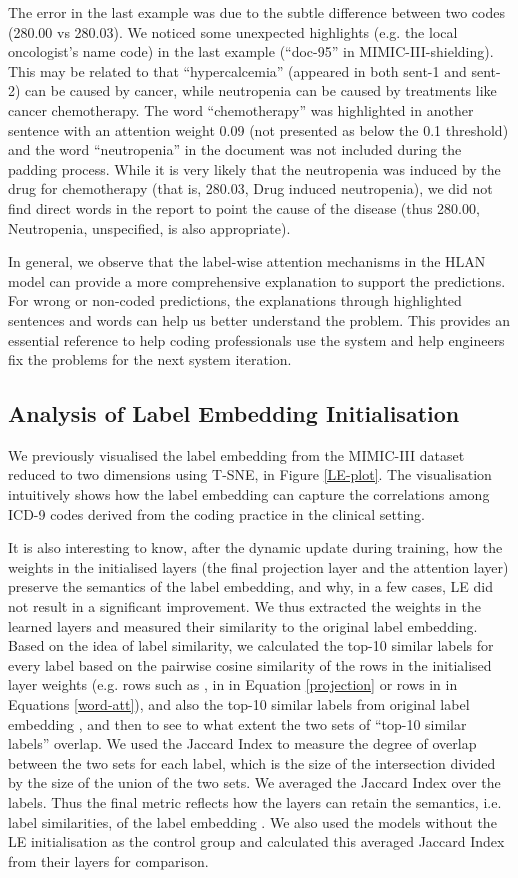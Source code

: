 \documentclass[final,5p,times,twocolumn]{elsarticle}
\begin{document}
The error in the last example was due to the subtle difference between two codes (280.00 vs 280.03). We noticed some unexpected highlights (e.g. the local oncologist's name code) in the last example (``doc-95'' in MIMIC-III-shielding). This may be related to that ``hypercalcemia'' (appeared in both sent-1 and sent-2) can be caused by cancer, while neutropenia can be caused by treatments like cancer chemotherapy. The word ``chemotherapy'' was highlighted in another sentence with an attention weight 0.09 (not presented as below the 0.1 threshold) and the word ``neutropenia'' in the document was not included during the padding process. While it is very likely that the neutropenia was induced by the drug for chemotherapy (that is, 280.03, Drug induced neutropenia), we did not find direct words in the report to point the cause of the disease (thus 280.00, Neutropenia, unspecified, is also appropriate).

In general, we observe that the label-wise attention mechanisms in the HLAN model can provide a more comprehensive explanation to support the predictions. For wrong or non-coded predictions, the explanations through highlighted sentences and words can help us better understand the problem. This provides an essential reference to help coding professionals use the system and help engineers fix the problems for the next system iteration.

\subsection{Analysis of Label Embedding Initialisation}
\label{le_analysis}
We previously visualised the label embedding from the MIMIC-III dataset reduced to two dimensions using T-SNE, in Figure \ref{LE-plot}. The visualisation intuitively shows how the label embedding can capture the correlations among ICD-9 codes derived from the coding practice in the clinical setting.

It is also interesting to know, after the dynamic update during training, how the weights in the initialised layers (the final projection layer and the attention layer) preserve the semantics of the label embedding, and why, in a few cases, LE did not result in a significant improvement. We thus extracted the weights in the learned layers and measured their similarity to the original label embedding. Based on the idea of label similarity, we calculated the top-10 similar labels for every label based on the pairwise cosine similarity of the rows in the initialised layer weights (e.g. rows such as ,  in  in Equation \ref{projection} or rows  in  in Equations \ref{word-att}), and also the top-10 similar labels from original label embedding , and then to see to what extent the two sets of ``top-10 similar labels'' overlap. We used the Jaccard Index to measure the degree of overlap between the two sets for each label, which is the size of the intersection divided by the size of the union of the two sets. We averaged the Jaccard Index over the labels. Thus the final metric reflects how the layers can retain the semantics, i.e. label similarities, of the label embedding . We also used the models without the LE initialisation as the control group and calculated this averaged Jaccard Index from their layers for comparison.
\end{document}
